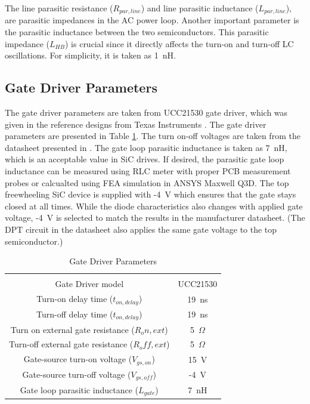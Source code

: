 \documentclass[12pt]{article} %
\begin{document}
The line parasitic resistance ($R_{par,line}$) and line parasitic inductance ($L_{par,line}$), are parasitic impedances in the AC power loop. Another important parameter is the parasitic inductance between the two semiconductors. This parasitic impedance ($L_{HB}$) is crucial since it directly affects the turn-on and turn-off LC oscillations. For simplicity, it is taken as 1~nH.

\subsection{Gate Driver Parameters}
The gate driver parameters are taken from UCC21530 gate driver, which was given in the reference designs from Texas Instruments \cite{TI}. The gate driver parameters are presented in Table \ref{tab:gatedriverparameters}. The turn on-off voltages are taken from the datasheet presented in \cite{Cree}. The gate loop parasitic inductance is taken as 7~nH, which is an acceptable value in SiC drives. If desired, the parasitic gate loop inductance can be measured using RLC meter with proper PCB measurement probes or calcualted using FEA simulation in ANSYS Maxwell Q3D. The top freewheeling SiC device is supplied with -4~V which ensures that the gate stays closed at all times. While the diode characteristics also changes with applied gate voltage, -4~V is selected to match the results in the manufacturer datasheet. (The DPT circuit in the datasheet also applies the same gate voltage to the top semiconductor.)

\begin{table}[h]
\centering
\caption{Gate Driver Parameters}
\label{tab:gatedriverparameters}
\begin{tabular}{cc}
\hline \\
Gate Driver model      &   UCC21530   \\
Turn-on delay time ($t_{on,delay}$)      &   19~ns   \\
Turn-off delay time ($t_{on,delay}$)    &   19~ns    \\
Turn on external gate resistance ($R_on,ext$)    &   5~$\Omega$    \\
Turn-off external gate resistance  ($R_off,ext$)     &   5~$\Omega$   \\
Gate-source turn-on voltage ($V_{gs,on}$) & 15~V\\
Gate-source turn-off voltage ($V_{gs,off}$) & -4~V\\
Gate loop parasitic inductance ($L_{gate}$) & 7~nH\\
\hline
\end{tabular}
\end{table}
\end{document}
